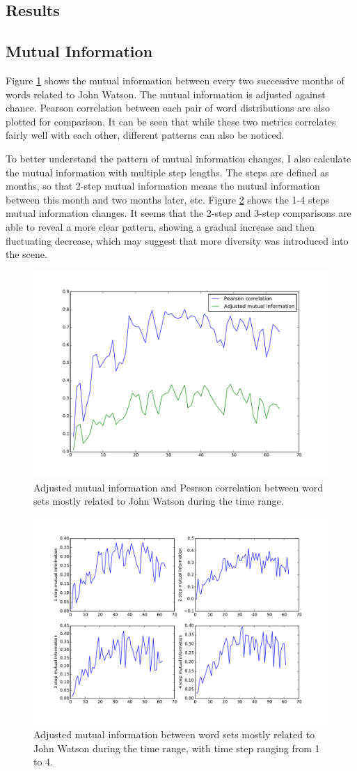 \documentclass{pnastwo}
\begin{document}
\begin{article}
\section{Results}
\subsection{Mutual Information} Figure \ref{mi_pearson} shows the mutual information between every two successive months of words related to John Watson. The mutual information is adjusted against chance. Pearson correlation between each pair of word distributions are also plotted for comparison. It can be seen that while these two metrics correlates fairly well with each other,  different patterns can also be noticed.

To better understand the pattern of mutual information changes, I also calculate the mutual information with multiple step lengths. The steps are defined as months, so that 2-step mutual information means the mutual information between this month and two months later, etc. Figure \ref{multi_mi} shows the 1-4 steps mutual information changes. It seems that the 2-step and 3-step comparisons are able to reveal a more clear pattern, showing a gradual increase and then fluctuating decrease, which may suggest that more diversity was introduced into the scene. 


\begin{figure}
\centerline{\includegraphics[width=.4\textwidth]{mi_pearson_watson.pdf}}
\caption{Adjusted mutual information and Pesrson correlation between word sets mostly related to John Watson during the time range.}\label{mi_pearson}
\end{figure}

\begin{figure}
\centerline{\includegraphics[width=.7\textwidth]{muti_step_mi_john.pdf}}
\caption{Adjusted mutual information between word sets mostly related to John Watson during the time range, with time step ranging from 1 to 4.}\label{multi_mi} 
\end{figure}



\end{article}
\end{document}
